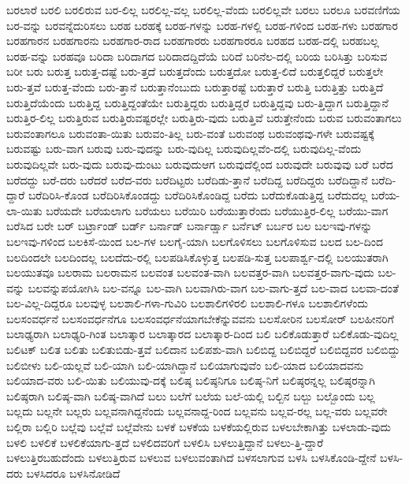 {ಬರಲಾರೆ
ಬರಲಿ
ಬರಲಿರುವ
ಬರ-ಲಿಲ್ಲ
ಬರಲಿಲ್ಲ-ವಲ್ಲ
ಬರಲಿಲ್ಲ-ವೆಂದು
ಬರಲಿಲ್ಲವೇ
ಬರಲು
ಬರಲೂ
ಬರವಣಿಗೆಯ
ಬರ-ವನ್ನು
ಬರವನ್ನೆದುರಿಸಲು
ಬರಹ
ಬರಹಕ್ಕೆ
ಬರಹ-ಗಳನ್ನು
ಬರಹ-ಗಳಲ್ಲಿ
ಬರಹ-ಗಳಿಂದ
ಬರಹ-ಗಳು
ಬರಹಗಾರ
ಬರಹಗಾರನ
ಬರಹಗಾರನು
ಬರಹಗಾರ-ರಾದ
ಬರಹಗಾರರು
ಬರಹಗಾರರೂ
ಬರಹದ
ಬರಹ-ದಲ್ಲಿ
ಬರಹಬಲ್ಲ
ಬರಹ-ವನ್ನು
ಬರಹವೂ
ಬರಿದಾ
ಬರಿದಾಗದ
ಬರಿದಾದದ್ದಿದೆಯೆ
ಬರಿದೆ
ಬರಿನೆಲ-ದಲ್ಲಿ
ಬರಿಯ
ಬರಿಸಿತ್ತು
ಬರಿಸುವ
ಬರೀ
ಬರು
ಬರುತ್ತ
ಬರುತ್ತ-ದಷ್ಟೆ
ಬರು-ತ್ತದೆ
ಬರುತ್ತದೆಂದು
ಬರುತ್ತದೋ
ಬರುತ್ತ-ಲಿದೆ
ಬರುತ್ತಲಿದ್ದರೆ
ಬರುತ್ತಲೇ
ಬರು-ತ್ತವೆ
ಬರುತ್ತ-ವೆಂದು
ಬರು-ತ್ತಾನೆ
ಬರುತ್ತಾನೆಂಬುದು
ಬರುತ್ತಾರಷ್ಟೆ
ಬರುತ್ತಾರೆ
ಬರುತ್ತಿ
ಬರುತ್ತಿತ್ತು
ಬರುತ್ತಿದೆ
ಬರುತ್ತಿದೆಯೆಂದು
ಬರುತ್ತಿದ್ದ
ಬರುತ್ತಿದ್ದಂತೆಯೇ
ಬರುತ್ತಿದ್ದರು
ಬರುತ್ತಿದ್ದರೆ
ಬರುತ್ತಿದ್ದವು
ಬರು-ತ್ತಿದ್ದಾಗ
ಬರುತ್ತಿದ್ದಾನೆ
ಬರುತ್ತಿರ-ಲಿಲ್ಲ
ಬರುತ್ತಿರುವ
ಬರುತ್ತಿರುವಷ್ಟರಲ್ಲೇ
ಬರುತ್ತಿರು-ವುದು
ಬರುತ್ತಿವೆ
ಬರುತ್ತೇನೆಂದು
ಬರುವ
ಬರುವಂತಾಗಲು
ಬರುವಂತಾಗಲೂ
ಬರುವಂತಾ-ಯಿತು
ಬರುವಂ-ತಿಲ್ಲ
ಬರು-ವಂತೆ
ಬರುವಂಥ
ಬರುವಂಥವು-ಗಳೇ
ಬರುವಷ್ಟಕ್ಕೆ
ಬರುವಷ್ಟು
ಬರು-ವಾಗ
ಬರುವು
ಬರು-ವುದನ್ನು
ಬರು-ವುದಿಲ್ಲ
ಬರುವುದಿಲ್ಲವೆಂ-ದಲ್ಲಿ
ಬರುವುದಿಲ್ಲ-ವೆಂದು
ಬರುವುದಿಲ್ಲವೇ
ಬರು-ವುದು
ಬರುವು-ದುಂಟು
ಬರುವುದುಆಗ
ಬರುವುದೆಲ್ಲಿಂದ
ಬರುವುದೇ
ಬರುವುವು
ಬರೆ
ಬರೆದ
ಬರೆದದ್ದು
ಬರೆ-ದರು
ಬರೆದರೆ
ಬರೆದ-ವರು
ಬರೆದಿಟ್ಟರು
ಬರೆದಿಡು-ತ್ತಾನೆ
ಬರೆದಿದ್ದ
ಬರೆದಿದ್ದರು
ಬರೆದಿದ್ದಾನೆ
ಬರೆದಿ-ದ್ದಾರೆ
ಬರೆದಿರಿಸಿ-ಕೊಂಡ
ಬರೆದಿರಿಸಿಕೊಂಡದ್ದು
ಬರೆದಿರಿಸಿಕೊಂಡಿದ್ದ
ಬರೆದು
ಬರೆದುಕೊಡುತ್ತಿದ್ದ
ಬರೆದುದಲ್ಲ
ಬರೆಯ-ಲಾ-ಯಿತು
ಬರೆಯದೇ
ಬರೆಯಲಾಗು
ಬರೆಯಲು
ಬರೆಯಿರಿ
ಬರೆಯುತ್ತಾರೆಂದು
ಬರೆಯುತ್ತಿರ-ಲಿಲ್ಲ
ಬರೆಯು-ವಾಗ
ಬರೆಸಿದ
ಬರೇ
ಬರ್
ಬರ್ಟ್ರಾಂಡ್
ಬರ್ಡ್
ಬರ್ನಾಡ್
ಬರ್ನಾರ್ಡ್ಷಾ
ಬರ್ನೆಟ್
ಬರ್ಬರ
ಬಲ
ಬಲಇವು-ಗಳನ್ನು
ಬಲಇವು-ಗಳಿಂದ
ಬಲಕಿಸೆ-ಯಿಂದ
ಬಲ-ಗಳ
ಬಲಗೈ-ಯಾಗಿ
ಬಲಗೊಳಿಸಲು
ಬಲಗೊಳಿಸುವ
ಬಲದ
ಬಲ-ದಿಂದ
ಬಲದಿಂದಲೇ
ಬಲದಿಂದಲ್ಲ
ಬಲದೆದು-ರಲ್ಲಿ
ಬಲಪಡಿಸಿಕೊಳ್ಳುತ್ತ
ಬಲಪಡಿ-ಸುತ್ತ
ಬಲಪಾರ್ಶ್ವ-ದಲ್ಲಿ
ಬಲಯುತರಾಗಿ
ಬಲಯುತವೂ
ಬಲರಾಮ
ಬಲರಾಮನ
ಬಲವಂತ
ಬಲವಂತ-ವಾಗಿ
ಬಲವತ್ತರ-ವಾಗಿ
ಬಲವತ್ತರ-ವಾಗು-ವುದು
ಬಲ-ವನ್ನು
ಬಲವನ್ನುಪಯೋಗಿಸಿ
ಬಲ-ವನ್ನೂ
ಬಲ-ವಾಗಿ
ಬಲವಾಗಿರು-ವಾಗ
ಬಲ-ವಾಗು-ತ್ತದೆ
ಬಲ-ವಾದ
ಬಲವಾ-ದಂತೆ
ಬಲ-ವಿಲ್ಲ-ದಿದ್ದರೂ
ಬಲವುಳ್ಳ
ಬಲಶಾಲಿ-ಗಳಾ-ಗುವಿರಿ
ಬಲಶಾಲಿಗಳಿರಲಿ
ಬಲಶಾಲಿ-ಗಳೂ
ಬಲಶಾಲಿಗಳೆಂದು
ಬಲಸಂವರ್ಧನೆ
ಬಲಸಂವರ್ಧನೆಗೂ
ಬಲಸಂವರ್ಧನೆಯಾಗಬೇಕೆನ್ನುವವನು
ಬಲಸೋರಿನ
ಬಲಸೋರ್
ಬಲಹೀನರಿಗೆ
ಬಲಾಢ್ಯರಾಗಿ
ಬಲಾಢ್ಯರಿ-ಗಿಂತ
ಬಲಾತ್ಕಾರ
ಬಲಾತ್ಕಾರದ
ಬಲಾತ್ಕಾರ-ದಿಂದ
ಬಲಿ
ಬಲಿಕೊಡುತ್ತಾರೆ
ಬಲಿಕೊಡು-ವುದಿಲ್ಲ
ಬಲಿಟಕ್
ಬಲಿತ
ಬಲಿತು
ಬಲಿತುಬಿಡು-ತ್ತವೆ
ಬಲಿದಾನ
ಬಲಿಪಶು-ವಾಗಿ
ಬಲಿಬಿದ್ದ
ಬಲಿಬಿದ್ದರೆ
ಬಲಿಬಿದ್ದವರ
ಬಲಿಬಿದ್ದು
ಬಲಿಬೀಳು
ಬಲಿ-ಯಲ್ಲವೆ
ಬಲಿ-ಯಾಗಿ
ಬಲಿ-ಯಾಗಿದ್ದಾನೆ
ಬಲಿಯಾಗುವುವೆಂ
ಬಲಿ-ಯಾದ
ಬಲಿಯಾದವನು
ಬಲಿಯಾದ-ವರು
ಬಲಿ-ಯಿತು
ಬಲಿಯುವು-ದಕ್ಕೆ
ಬಲಿಷ್ಠ
ಬಲಿಷ್ಠನಿಗೂ
ಬಲಿಷ್ಠ-ನಿಗೆ
ಬಲಿಷ್ಠರನ್ನಲ್ಲ
ಬಲಿಷ್ಠರನ್ನಾಗಿ
ಬಲಿಷ್ಠರಾಗಿ
ಬಲಿಷ್ಠ-ವಾಗಿ
ಬಲಿಷ್ಠ-ವಾಗಿದೆ
ಬಲು
ಬಲೆಗೆ
ಬಲೆಯ
ಬಲೆ-ಯಲ್ಲಿ
ಬಲ್ಬಿನ
ಬಲ್ಬು
ಬಲ್ಬೊಂದು
ಬಲ್ಲ
ಬಲ್ಲದು
ಬಲ್ಲನೇ
ಬಲ್ಲರು
ಬಲ್ಲವನಾಗಿದ್ದನೆಂದು
ಬಲ್ಲವನಾದ್ದ-ರಿಂದ
ಬಲ್ಲವನು
ಬಲ್ಲವ-ರಲ್ಲ
ಬಲ್ಲ-ವರು
ಬಲ್ಲವರೇ
ಬಲ್ಲಿರಾ
ಬಲ್ಲಿರಿ
ಬಲ್ಲೆವು
ಬಲ್ಲೆವೆ
ಬಲ್ಲೆವೇನು
ಬಳಕೆ
ಬಳಕೆಯ
ಬಳಕೆಯಲ್ಲಿರುವ
ಬಳಲಬೇಕಾಗಿತ್ತು
ಬಳಲಾಡು-ವುದು
ಬಳಲಿ
ಬಳಲಿಕೆ
ಬಳಲಿಕೆಯಾಗು-ತ್ತದೆ
ಬಳಲಿದವರಿಗೆ
ಬಳಲಿಸಿ
ಬಳಲುತ್ತಿದ್ದಾನೆ
ಬಳಲು-ತ್ತಿ-ದ್ದಾರೆ
ಬಳಲುತ್ತಿರಬಹುದೆಂದು
ಬಳಲುತ್ತಿರುವ
ಬಳಲುವ
ಬಳಲುವಂತಾಗಿದೆ
ಬಳಸಲಾಗುವ
ಬಳಸಿ
ಬಳಸಿಕೊಂಡಿ-ದ್ದೇನೆ
ಬಳಸಿ-ದರು
ಬಳಸಿದರೂ
ಬಳಸಿನೋಡಿದೆ
}
